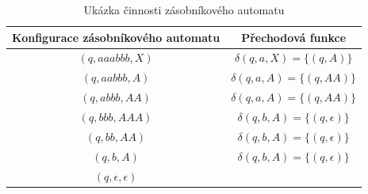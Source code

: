\begin{table}[h]
    \centering
    \begin{tabular}{c|c}
        Konfigurace zásobníkového automatu & Přechodová funkce \\
        \hline
        $(q,aaabbb,X)$ & $\delta(q,a,X) = \{(q,A)\}$ \\
        $(q,aabbb,A)$ & $\delta(q,a,A) = \{(q,AA)\}$ \\
        $(q,abbb,AA)$ & $\delta(q,a,A) = \{(q,AA)\}$ \\
        $(q,bbb,AAA)$ & $\delta(q,b,A) = \{(q,\epsilon)\}$ \\
        $(q,bb,AA)$ & $\delta(q,b,A) = \{(q,\epsilon)\}$ \\
        $(q,b,A)$ & $\delta(q,b,A) = \{(q,\epsilon)\}$ \\
        $(q,\epsilon,\epsilon)$ &  \\
    \end{tabular}
    \caption{Ukázka činnosti zásobníkového automatu }\label{tab:DemonstationOfPDA}
\end{table}

\endinput